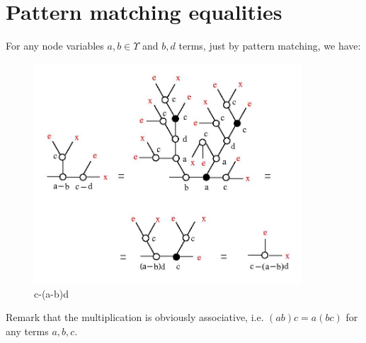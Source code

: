 \documentclass{article}
\begin{document}
\section{Pattern matching equalities}
\label{spatmat}

For any node variables $a, b \in \Upsilon$ and $b, d$ terms, just by pattern matching, we have:  

\begin{figure}[h]
   \centerline{\includegraphics[width=100mm]{jpg/accept_4.jpg}}
\caption{ c-(a-b)d }
\label{fig1}
\end{figure}

Remark that the multiplication is obviously associative, i.e. $(ab)c = a(bc)$ for any terms $a, b, c$.
\end{document}
